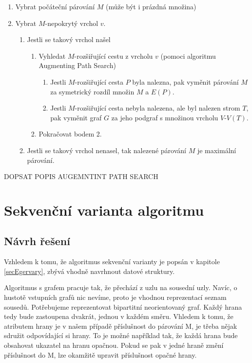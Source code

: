\documentclass[a4paper, 11pt, titlepage, final]{article}[3. prosinec 2011]
\begin{document}
\begin{enumerate}
\item Vybrat počáteční párování $M$ (může být i prázdná množina)
\item Vybrat $M$-nepokrytý vrchol $v$.
	\begin{enumerate}
	\item Jestli se takový vrchol našel 
		\begin{enumerate}
		\item Vyhledat $M$-rozšiřující cestu z vrcholu $v$ (pomoci algoritmu Augmenting Path Search)
			\begin{enumerate}
			\item Jestli $M$-rozšiřující cesta $P$ byla nalezna, pak vyměnit párování $M$ za symetrický rozdíl množin $M$ a $E(P)$.
			\item Jestli $M$-rozšiřující cesta nebyla nalezena, ale byl nalezen strom $T$, pak vyměnit graf $G$ za jeho podgraf s množinou vrcholu $V$-$V(T)$.
			\end{enumerate}
		\item Pokračovat bodem 2.
		\end{enumerate}
	\item Jestli se takový vrchol nenasel, tak nalezené párování $M$ je maximální párování.
	\end{enumerate}
\end{enumerate}


DOPSAT POPIS AUGEMNTINT PATH SEARCH

\section{Sekvenční varianta algoritmu} \label{secSeq}

\subsection{Návrh řešení}

Vzhledem k tomu, že algoritmus sekvenční varianty je popsán v kapitole \ref{secEgervary}, zbývá vhodně navrhnout datové struktury. 

Algoritmus s grafem pracuje tak, že přechází z uzlu na sousední uzly. Navíc, o hustotě vstupních grafů nic nevíme, proto je vhodnou reprezentací seznam sousedů. Potřebujeme reprezentovat bipartitní neorientovaný graf. Každý hrana tedy bude zastoupena dvakrát, jednou v každém směru. Vhledem k tomu, že atributem hrany je v našem případě příslušnost do párování M, je třeba nějak sdružit odpovídající si hrany. To je možné například tak, že každá hrana bude obsahovat ukazatel na hranu opačnou. Pokud se pak v jedné hraně změní příslušnost do M, lze okamžitě upravit příslušnost opačné hrany.
\end{document}
